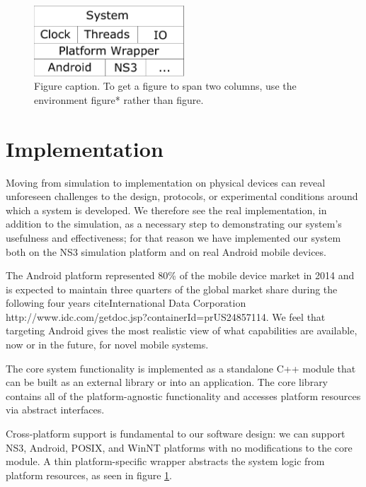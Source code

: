 \documentclass[10pt,twocolumn]{article}
\begin{document}
\begin{figure}[!b]
  \begin{center}
    \includegraphics[width=0.5\textwidth]{android-platform-wrapper.pdf}
  \end{center}

  \caption{\small Figure caption. To get a figure to span two
      columns, use the environment figure* rather than figure.}
  \label{fig:android-platform-wrapper}
\end{figure}

\section{Implementation}

Moving from simulation to implementation on physical devices can reveal unforeseen challenges to the design, protocols, or experimental conditions around which a system is developed. We therefore see the real implementation, in addition to the simulation, as a necessary step to demonstrating our system's usefulness and effectiveness; for that reason we have implemented our system both on the NS3 simulation platform and on real Android mobile devices.

The Android platform represented 80\% of the mobile device market in 2014 and is expected to maintain three quarters of the global market share during the following four years cite{International Data Corporation http://www.idc.com/getdoc.jsp?containerId=prUS24857114}. We feel that targeting Android gives the most realistic view of what capabilities are available, now or in the future, for novel mobile systems.

The core system functionality is implemented as a standalone C++ module that can be built as an external library or into an application. The core library contains all of the platform-agnostic functionality and accesses platform resources via abstract interfaces.

Cross-platform support is fundamental to our software design: we can support NS3, Android, POSIX, and WinNT platforms with no modifications to the core module. A thin platform-specific wrapper abstracts the system logic from platform resources, as seen in figure \ref{fig:android-platform-wrapper}.
\end{document}
